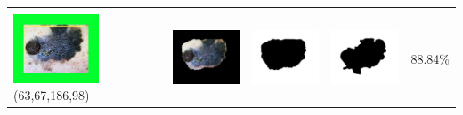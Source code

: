\begin{table}[H]
\begin{tabular}{|m{1.0in}|m{1.0in}|m{1.0in}|m{1.0in}|m{0.6in}|}
		&  &  & \\
		\includegraphics[width=1.0in]{gambar/hasil_segmentasi/luka_hitam/image_27_rect.jpg} {\centering\fontsize{10}{10}\selectfont(63,67,186,98)}&
		\includegraphics[width=1.0in]{gambar/hasil_segmentasi/luka_hitam/result_27.jpg}&
		\includegraphics[width=1.0in]{gambar/hasil_segmentasi/luka_hitam/mask_r_27.jpg}&
		\includegraphics[width=1.0in]{gambar/hasil_segmentasi/luka_hitam/27_r.jpg}&
		88.84\% \\
		\hline 

	\end{tabular}
\end{table}


